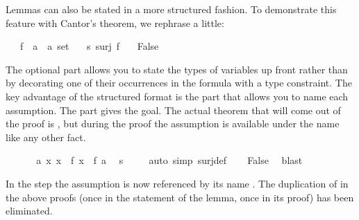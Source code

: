 \begin{isabellebody}
\begin{isamarkuptext}
Lemmas can also be stated in a more structured fashion. To demonstrate this
feature with Cantor's theorem, we rephrase 
a little:%
\end{isamarkuptext}%
\isamarkuptrue%
\isamarkupfalse%
\isanewline
\ \ \ f\ {}{}\ {}{}a\ {}\ {}a\ set{}\isanewline
\ \ \ s{}\ {}surj\ f{}\isanewline
\ \ \ {}False{}%
\isadelimproof
%
\endisadelimproof
%
\isatagproof
%
\begin{isamarkuptxt}%
The optional  part allows you to state the types of
variables up front rather than by decorating one of their occurrences in the
formula with a type constraint. The key advantage of the structured format is
the  part that allows you to name each assumption. The
 part gives the goal. The actual theorem that will come out of
the proof is , but during the proof the assumption
 is available under the name  like any other fact.%
\end{isamarkuptxt}%
\isamarkuptrue%
\isamarkupfalse%
\ {}\isanewline
\ \ \isamarkupfalse%
\ {}{}\ a{}\ {}x{}\ x\ {}\ f\ x{}\ {}\ f\ a{}\ \isamarkupfalse%
\ s\isanewline
\ \ \ \ \isamarkupfalse%
{}auto\ simp{}\ surj{}def{}\isanewline
\ \ \isamarkupfalse%
\ {}False{}\ \isamarkupfalse%
\ blast\isanewline
{}\isamarkupfalse%
%
\endisatagproof
{\isafoldproof}%
%
\isadelimproof
%
\endisadelimproof
%
\begin{isamarkuptext}%
In the  step the assumption  is now
referenced by its name . The duplication of  in the
above proofs (once in the statement of the lemma, once in its proof) has been
eliminated.


\end{isamarkuptext}
\end{isabellebody}
